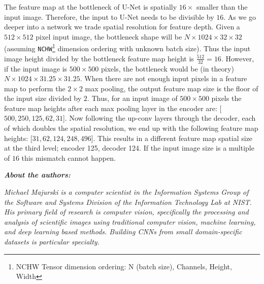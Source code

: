 \documentclass[10pt, indentfirst]{article}
\begin{document}
The feature map at the bottleneck of U-Net is spatially $16 \times$ smaller than the input image. Therefore, the input to U-Net needs to be divisible by $16$.
As we go deeper into a network we trade spatial resolution for feature depth. Given a $512 \times 512$ pixel input image, the bottleneck shape will be $N \times 1024 \times 32 \times 32$ (assuming \texttt{NCHW}\footnote{NCHW Tensor dimension ordering: N (batch size), Channels, Height, Width} dimension ordering with unknown batch size). Thus the input image height divided by the bottleneck feature map height is $\frac{512}{32} = 16$. However, if the input image is $500 \times 500$ pixels, the bottleneck would be (in theory) $N \times 1024 \times 31.25 \times 31.25$. When there are not enough input pixels in a feature map to perform the $2 \times 2$ max pooling, the output feature map size is the floor of the input size divided by $2$. 
Thus, for an input image of $500 \times 500$ pixels the feature map heights after each max pooling layer in the encoder are: [$500, 250, 125, 62, 31$]. Now following the up-conv layers through the decoder, each of which doubles the spatial resolution, we end up with the following feature map heights: [$31, 62, 124, 248, 496$]. This results in a different feature map spatial size at the third level; encoder 125, decoder 124. If the input image size is a multiple of $16$ this mismatch cannot happen. 

\vspace{20pt}



\renewcommand{\bibname}{References}


{
	\footnotesize

} 


\vspace{20pt} 

\noindent\textit{\textbf{About the authors:}}

\noindent\textit{Michael Majurski is a computer scientist in the Information Systems Group of the Software and Systems Division of the Information Technology Lab at NIST. His primary field of research is computer vision, specifically the processing and analysis of scientific images using traditional computer vision, machine learning, and deep learning based methods. Building CNNs from small domain-specific datasets is particular specialty.}
\end{document}
